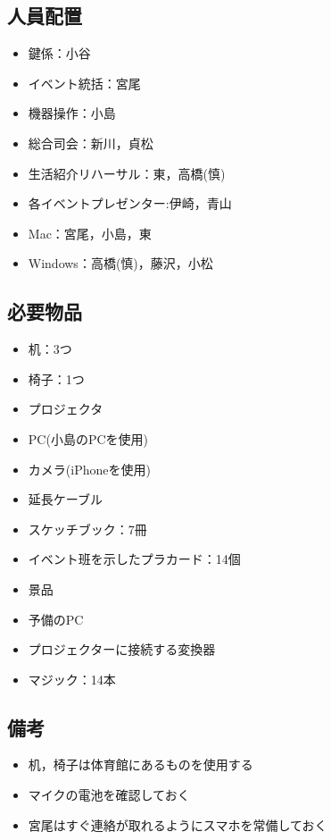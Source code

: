 \subsection{人員配置}
\begin{itemize}
\item 鍵係：小谷
\item イベント統括：宮尾
\item 機器操作：小島
\item 総合司会：新川，貞松
\item 生活紹介リハーサル：東，高橋(慎)
\item 各イベントプレゼンター:伊崎，青山
\item Mac：宮尾，小島，東
\item Windows：高橋(慎)，藤沢，小松
\end{itemize}




\subsection{必要物品}
\begin{itemize}
\item 机：3つ
\item 椅子：1つ
\item プロジェクタ
\item PC(小島のPCを使用)
\item カメラ(iPhoneを使用)
\item 延長ケーブル
\item スケッチブック：7冊
\item イベント班を示したプラカード：14個
\item 景品
\item 予備のPC
\item プロジェクターに接続する変換器
\item マジック：14本
\end{itemize}


\subsection{備考}
\begin{itemize}
\item 机，椅子は体育館にあるものを使用する
\item マイクの電池を確認しておく
\item 宮尾はすぐ連絡が取れるようにスマホを常備しておく
\end{itemize}

%

